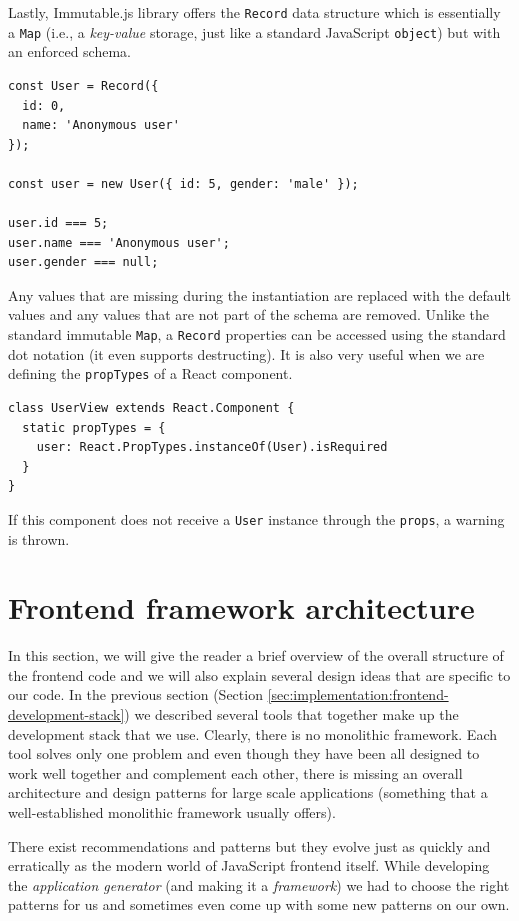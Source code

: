 Lastly, Immutable.js library offers the \texttt{Record} data structure which is essentially a \texttt{Map} (i.e., a \emph{key-value} storage, just like a standard JavaScript \texttt{object}) but with an enforced schema.

\begin{verbatim}
const User = Record({
  id: 0,
  name: 'Anonymous user'
});

const user = new User({ id: 5, gender: 'male' });

user.id === 5;
user.name === 'Anonymous user';
user.gender === null;
\end{verbatim}

Any values that are missing during the instantiation are replaced with the default values and any values that are not part of the schema are removed. Unlike the standard immutable \texttt{Map}, a \texttt{Record} properties can be accessed using the standard dot notation (it even supports destructing). It is also very useful when we are defining the \texttt{propTypes} of a React component.

\begin{verbatim}
class UserView extends React.Component {
  static propTypes = {
    user: React.PropTypes.instanceOf(User).isRequired
  }
}
\end{verbatim}

If this component does not receive a \texttt{User} instance through the \texttt{props}, a warning is thrown.

\section{Frontend framework architecture}
\label{sec:implementation:frontend-architecture}

In this section, we will give the reader a brief overview of the  overall structure of the frontend code and we will also explain several design ideas that are specific to our code. In the previous section (Section \ref{sec:implementation:frontend-development-stack}) we described several tools that together make up the development stack that we use. Clearly, there is no monolithic framework. Each tool solves only one problem and even though they have been all designed to work well together and complement each other, there is missing an overall architecture and design patterns for large scale applications (something that a well-established monolithic framework usually offers).

There exist recommendations and patterns but they evolve just as quickly and erratically as the modern world of JavaScript frontend itself. While developing the \emph{application generator} (and making it a \emph{framework}) we had to choose the right patterns for us and sometimes even come up with some new patterns on our own.

